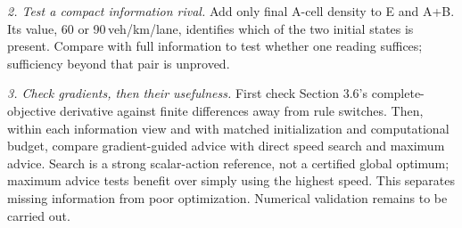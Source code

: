 \documentclass[10pt,a4paper]{article}
\begin{document}
\emph{2. Test a compact information rival.} Add only final A-cell density
to E and A+B. Its value, 60 or 90\,veh/km/lane, identifies which of the two
initial states is present. Compare with full information to test whether one reading
suffices; sufficiency beyond that pair is unproved.

\emph{3. Check gradients, then their usefulness.} First check Section 3.6's
complete-objective derivative against finite differences away from rule
switches. Then, within each information view and with matched initialization
and computational budget, compare gradient-guided advice with direct speed
search and maximum advice. Search is a strong scalar-action reference,
not a certified global optimum; maximum advice tests benefit over simply
using the highest speed. This separates missing information from poor
optimization. Numerical validation remains to be carried out.
\end{document}
